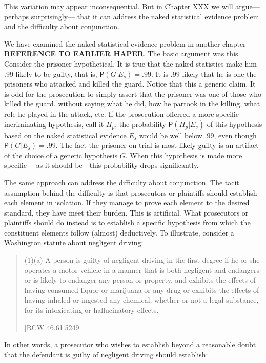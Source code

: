 \documentclass[
  10pt,
  dvipsnames,enabledeprecatedfontcommands]{scrartcl}
\newcommand{\pr}[1]{\mathsf{P}(#1)}
\begin{document}
This variation may appear inconsequential. But in Chapter XXX
 we will argue--- perhaps surprisingly--- that it can address
the naked statistical evidence problem and the difficulty about
conjunction.

We have examined the naked statistical evidence problem in another
chapter \textbf{REFERENCE TO EARLIER HAPER}. The basic argument was
this. Consider the prisoner hypothetical. It is true that the naked
statistics make him .99 likely to be guilty, that is,
\(\pr{G \vert E_s} =.99\). It is \(.99\) likely that he is one the
prisoners who attacked and killed the guard. Notice that this a generic
claim. It is odd for the prosecution to simply assert that the prisoner
was one of those who killed the guard, without saying what he did, how
he partook in the killing, what role he played in the attack, etc. If
the prosecution offerred a more specific incriminating hypothesis, call
it \(H_p\), the probability \(\pr{H_p \vert E_{s}}\) of this hypothesis
based on the naked statistical evidence \(E_s\) would be well below
\(.99\), even though \(\pr{G \vert E_s}=.99\). The fact the prisoner on
trial is most likely guilty is an artifact of the choice of a generic
hypothesis \(G\). When this hypothesis is made more specific ---as it
should be---this probability drops significantly.

The same approach can address the difficulty about conjunction. The
tacit assumption behind the difficulty is that prosecutors or plaintiffs
should establish each element in isolation. If they manage to prove each
element to the desired standard, they have meet their burden. This is
artificial. What prosecutors or plaintiffs should do instead is to
establish a specific hypothesis from which the constituent elements
follow (almost) deductively. To illustrate, consider a Washington
statute about negligent driving:

\begin{quote}
(1)(a) A person is guilty of negligent driving in the first degree if he or she operates a motor vehicle in a manner that is both negligent and endangers or is likely to endanger any person or property, and exhibits the effects of having consumed liquor or marijuana or any drug or exhibits the effects of having inhaled or ingested any chemical, whether or not a legal substance, for its intoxicating or hallucinatory effects. 

[RCW 46.61.5249]
\end{quote}

\noindent In other words, a prosecutor who wishes to establish beyond a
reasonable doubt that the defendant is guilty of negligent driving
should establish:
\end{document}
